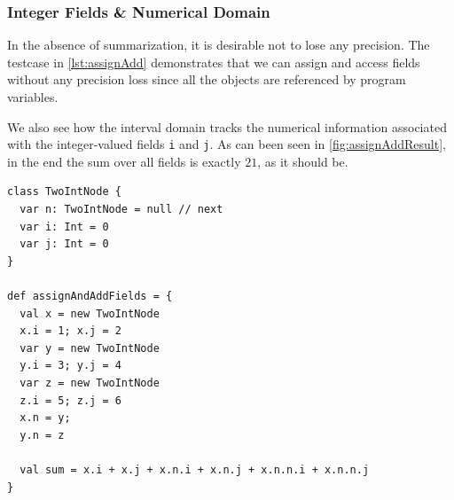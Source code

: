 \documentclass[11pt,a4paper,english]{article}
\begin{document}
\subsubsection{Integer Fields \& Numerical Domain}
In the absence of summarization, it is desirable not to lose any precision. The
testcase in \autoref{lst:assignAdd} demonstrates that we can assign and access
fields without any precision loss since all the objects are referenced by
program variables.

We also see how the interval domain tracks the numerical information associated
with the integer-valued fields \texttt{i} and \texttt{j}. As can been seen in
\autoref{fig:assignAddResult}, in the end the sum over all fields is exactly $21$, as it
should be.

\begin{lstlisting}[float,caption={Field assignment testcase},label={lst:assignAdd}]
class TwoIntNode {
  var n: TwoIntNode = null // next
  var i: Int = 0
  var j: Int = 0
}

def assignAndAddFields = {
  val x = new TwoIntNode
  x.i = 1; x.j = 2
  var y = new TwoIntNode
  y.i = 3; y.j = 4
  var z = new TwoIntNode
  z.i = 5; z.j = 6
  x.n = y; 
  y.n = z

  val sum = x.i + x.j + x.n.i + x.n.j + x.n.n.i + x.n.n.j
}
\end{lstlisting}
\end{document}
